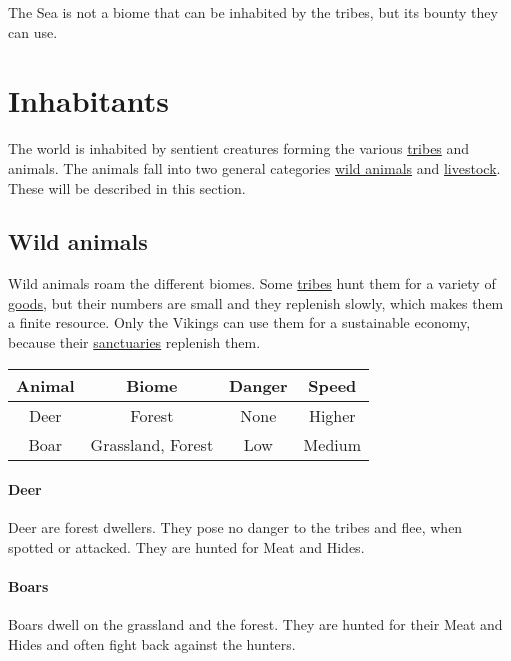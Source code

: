 The \gls*{Sea} is not a biome that can be inhabited by the tribes, but its
bounty they can use.

\printglossary[type=biome, title=Biome-Glossary]{}\label{ch:World:BiomesGlossary}

\section{Inhabitants}\label{ch:World:Inhabitants}

The world is inhabited by sentient creatures forming the various
\hyperref[ch:Tribes]{tribes} and animals. The animals fall into two general
categories \hyperref[ch:World:Inhabitants:Animals]{wild animals} and
\hyperref[ch:World:Inhbitants:Livestock]{livestock}. These will be described in
this section.

\subsection{Wild animals}\label{ch:World:Inhabitants:Animals}

Wild animals roam the different biomes. Some \hyperref[ch:Tribes]{tribes} hunt
them for a variety of \hyperref[ch:Goods:Nature:Animals]{goods}, but their
numbers are small and they replenish slowly, which makes them a finite
resource. Only the \gls{Vikings} can use them for a sustainable economy,
because their \hyperref[ch:Tribes:Vikings:Religion:Forest]{sanctuaries}
replenish them.

\begin{longtable}{cccc}
	\toprule
	Animal     & Biome                         & Danger & Speed  \\
	\midrule
	\Gls{Deer} & \Gls{Forest}                  & None   & Higher \\
	\Gls{Boar} & \Gls{Grassland}, \Gls{Forest} & Low    & Medium \\
	\bottomrule
\end{longtable}

\paragraph{Deer}
Deer are forest dwellers. They pose no danger to the tribes and flee, when
spotted or attacked. They are hunted for \gls{Meat} and \glspl{Hide}.

\paragraph{Boars}
Boars dwell on the grassland and the forest. They are hunted for their
\gls{Meat} and \glspl{Hide} and often fight back against the hunters.


